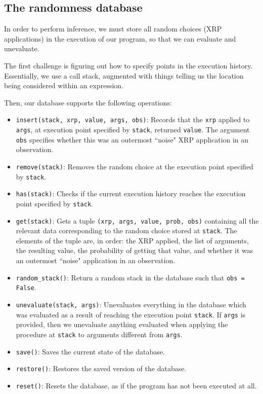 \documentclass[11pt]{article}
\begin{document}
\subsection{The randomness database}

In order to perform inference, we must store all random choices (XRP applications) in the execution of our program, so that we can evaluate and unevaluate.  

The first challenge is figuring out how to specify points in the execution history.  Essentially, we use a call stack, augmented with things telling us the location being considered within an expression.  

Then, our database supports the following operations:

\begin{itemize}
\item {\tt insert(stack, xrp, value, args, obs)}:  Records that the {\tt xrp} applied to {\tt args}, at execution point specified by {\tt stack}, returned {\tt value}.  The argument {\tt obs} specifies whether this was an outermost ``noise" XRP application in an observation.  
\item {\tt remove(stack)}:  Removes the random choice at the execution point specified by {\tt stack}.  
\item {\tt has(stack)}:  Checks if the current execution history reaches the execution point specified by {\tt stack}.  
\item {\tt get(stack)}:  Gets a tuple {\tt (xrp, args, value, prob, obs)} containing all the relevant data corresponding to the random choice stored at {\tt stack}.  The elements of the tuple are, in order:  the XRP applied, the list of arguments, the resulting value, the probability of getting that value, and whether it was an outermost ``noise" application in an observation.
\item {\tt random\_stack()}:  Return a random stack in the database such that {\tt obs = False}.  
\item {\tt unevaluate(stack, args)}: Unevaluates everything in the database which was evaluated as a result of reaching the execution point {\tt stack}.  If {\tt args} is provided, then we unevaluate anything evaluated when applying the procedure at {\tt stack} to arguments different from {\tt args}.
\item {\tt save()}: Saves the current state of the database.
\item {\tt restore()}: Restores the saved version of the database.
\item {\tt reset()}: Resets the database, as if the program has not been executed at all.  
\end{itemize}
\end{document}
